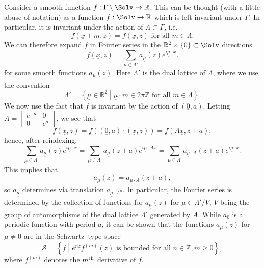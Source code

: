Consider a smooth function $f:\Gamma\setminus\Solv\rightarrow\mathbb{R}$. This can be thought (with a little abuse of notation) as a function $f:\Solv\rightarrow \mathbb{R}$ which is left invariant under $\Gamma$. In particular, it is invariant under the action of $\Lambda\subset\Gamma$, i.e.
\[
f(\underline{x}+m,z)=f(\underline{x},z)\text{ for all }m\in \Lambda.
\]
We can therefore expand $f$ in Fourier series in the $\mathbb{R}^2\times\{0\}\subset\Solv$ directions
\[
f(\underline{x},z)=\sum_{\mu\in \Lambda'} a_{\underline{\mu}}(z)e^{ i \underline{\mu}\cdot \underline{x}}.
\]
for some smooth functions $a_{\underline{\mu}}(z)$. Here $\Lambda'$ is the dual lattice of $\Lambda$, where we use the convention
\[
\Lambda'=\left\{\underline{\mu}\in \mathbb{R}^2\middle| \underline{\mu}\cdot m\in 2\pi\mathbb{Z}\text{ for all }m\in\Lambda\right\}.
\]
We now use the fact that $f$ is invariant by the action of $(\underline{0},a)$. Letting $A=
\begin{bmatrix}e^{-a}&0\\0 &e^{a}
\end{bmatrix}$, we see that
\[
f(\underline{x},z)=f((\underline{0},a)\cdot(\underline{x},z))=f(A\underline{x}, z+a),
\]
hence, after reindexing,
\[
\sum_{\underline{\mu}\in \Lambda'} a_{\underline{\mu}}(z)e^{ i \underline{\mu}\cdot \underline{x}}=\sum_{\underline{\mu}\in \Lambda'} a_{\underline{\mu}}(z+a)e^{ i \underline{\mu}\cdot A\underline{x}}=\sum_{\underline{\mu}\in \Lambda'} a_{\underline{\mu}\cdot A}(z+a)e^{ i \underline{\mu}\cdot\underline{x}}.
\]
This implies that
\[
a_{\underline{\mu}}(z)=a_{\underline{\mu}\cdot A}(z+a),
\]
so $a_{\underline{\mu}}$ determines via translation $a_{\underline{\mu}\cdot A^n}$. In particular, the Fourier series is determined by the collection of functions for $a_{\underline{\mu}}(z)$ for $\underline{\mu}\in \Lambda'/V$, $V$ being the group of automorphisms of the dual lattice $\Lambda'$ generated by $A$. While $a_0$ is a periodic function with period $a$, it can be shown that the functions $a_{\underline{\mu}}(z)$ for $\underline{\mu}\neq 0$ are in the Schwartz--type space
\begin{equation}\label{schwartz}
\mathcal{S}=\left\{f\middle| e^{nz}f^{(m)}(z) \text{ is bounded for all }n\in\mathbb{Z},m\geq0\right\},
\end{equation}
where $f^{(m)}$ denotes the $m^{\rm th}$ derivative of $f$.


